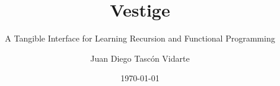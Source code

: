 \documentclass[mathserif]{beamer}
\title{Vestige}
\subtitle{A Tangible Interface for Learning Recursion and Functional Programming}
\author{Juan Diego Tascón Vidarte}
\institute{Konkuk University \\ HCI Lab}
\date{\today{}}
\begin{document}
\begin{frame}
  \titlepage
\end{frame}

\begin{frame}{}
  \tableofcontents
\end{frame}





\nocite{*}
\end{document}
